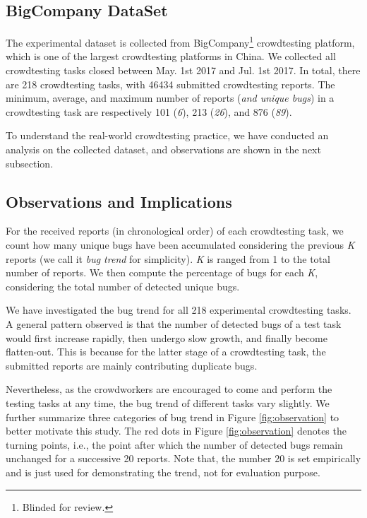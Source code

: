 \documentclass[sigconf,review, anonymous]{acmart}
\newcommand{\task}{218}
\newcommand{\company}{BigCompany}
\begin{document}
\subsection{{\company} DataSet}
\label{subsec:background_dataset}

The experimental dataset is collected from {\company}\footnote{Blinded for review.} crowdtesting platform, which is one of the largest crowdtesting platforms in China.
We collected all crowdtesting tasks closed between May. 1st 2017 and Jul. 1st 2017.
In total, there are 218 crowdtesting tasks, with 46434 submitted crowdtesting reports.
The minimum, average, and maximum number of reports (\textit{and unique bugs}) in a crowdtesting task are respectively 101 (\textit{6}), 213 (\textit{26}), and 876 (\textit{89}).

To understand the real-world crowdtesting practice, we have conducted an analysis on the collected dataset, and observations are shown in the next subsection.


\subsection{Observations and Implications}
\label{subsec:background_observations}

For the received reports (in chronological order) of each crowdtesting task, we  count how many unique bugs have been accumulated considering the previous \textit{K} reports (we call it \textit{bug trend} for simplicity).
\textit{K} is ranged from 1 to the total number of reports.
We then compute the percentage of bugs for each \textit{K}, considering the total number of detected unique bugs.

We have investigated the bug trend for all {\task} experimental crowdtesting tasks.
A general pattern observed is that the number of detected bugs of a test task would first increase rapidly, then undergo slow growth, and finally become flatten-out.
This is because for the latter stage of a crowdtesting task, the submitted reports are mainly contributing duplicate bugs.

Nevertheless, as the crowdworkers are encouraged to come and perform the testing tasks at any time, the bug trend of different tasks vary slightly. 
We further summarize three categories of bug trend in Figure \ref{fig:observation} to better motivate this study. 
The red dots in Figure \ref{fig:observation} denotes the turning points, i.e., the point after which the number of detected bugs remain unchanged for a successive 20 reports.
Note that, the number 20 is set empirically and is just used for demonstrating the trend, not for evaluation purpose. 
\end{document}
